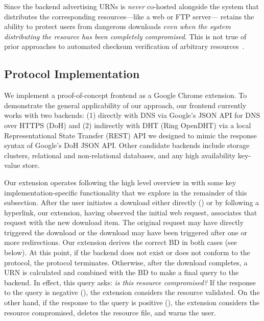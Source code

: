 Since the backend advertising URNs is \emph{never} co-hosted alongside the
system that distributes the corresponding resources---like a web or FTP
server---\SYSTEM{} retains the ability to protect users from dangerous downloads
\emph{even when the system distributing the resource has been completely
compromised}. This is not true of prior approaches to automated checksum
verification of arbitrary resources~\cite{Cherubini}.

\subsection{Protocol Implementation}

We implement a proof-of-concept \SYSTEM{} frontend as a Google Chrome extension.
To demonstrate the general applicability of our approach, our frontend currently
works with two backends: (1) directly with DNS via Google's JSON API for DNS
over HTTPS (DoH) and (2) indirectly with DHT (Ring OpenDHT) via a local
Representational State Transfer (REST) API we designed to mimic the response
syntax of Google's DoH JSON API. Other candidate backends include storage
clusters, relational and non-relational databases, and any high availability
key-value store.

Our extension operates following the high level overview in 
with some key implementation-specific functionality that we explore in the
remainder of this subsection. After the user initiates a download either
directly () or by following a hyperlink, our
extension, having observed the initial web request, associates that request with
the new download item. The original request may have directly triggered the
download or the download may have been triggered after one or more redirections.
Our extension derives the correct BD in both cases (see below). At this point,
if the backend does not exist or does not conform to the protocol, the protocol
terminates. Otherwise, after the download completes, a URN is calculated and
combined with the BD to make a final query to the backend. In effect, this query
asks: \emph{is this resource compromised?} If the response to the query is
negative (), the extension considers
the resource validated. On the other hand, if the response to the query is
positive (), the extension
considers the resource compromised, deletes the resource file, and warns the
user.

